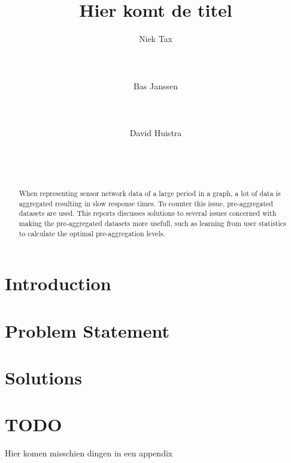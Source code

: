 \documentclass{sig-alternate-br}
\begin{document}

\title{Hier komt de titel}

\author{
\alignauthor Niek Tax\\
       \\
       \\
       \\
\alignauthor Bas Janssen\\
       \\
       \\
       \\
\alignauthor David Huistra\\
              \\
              \\
              \\
}

\maketitle
\begin{abstract}
When representing sensor network data of a large period in a graph, a lot of data is aggregated resulting in slow response times. To counter this issue, pre-aggregated
datasets are used. This reports discusses solutions to several issues concerned with making the pre-aggregated datasets more usefull, such as learning from user statistics to calculate the optimal pre-aggregation levels.
\end{abstract} 


\section{Introduction}

\section{Problem Statement}

\section{Solutions}

%




\balancecolumns

\onecolumn
\appendix

\section{TODO}
Hier komen misschien dingen in een appendix
\end{document}
